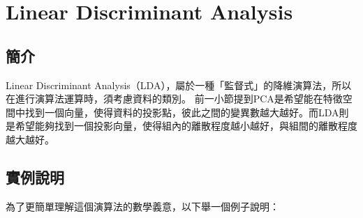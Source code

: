 \chapter{Linear Discriminant Analysis}
\label{chapter:pca}
\section{簡介}
\label{sec:background}




Linear Discriminant Analysis（LDA），屬於一種「監督式」的降維演算法，所以在進行演算法運算時，須考慮資料的類別。
前一小節提到PCA是希望能在特徵空間中找到一個向量，使得資料的投影點，彼此之間的變異數越大越好。而LDA則是希望能夠找到一個投影向量，使得組內的離散程度越小越好，與組間的離散程度越大越好。




\section{實例說明}
為了更簡單理解這個演算法的數學義意，以下舉一個例子說明：



